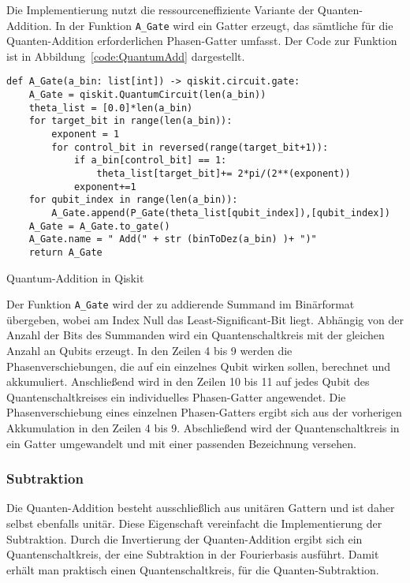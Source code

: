 Die Implementierung nutzt die ressourceneffiziente Variante der Quanten-Addition.
In der Funktion \texttt{A\_Gate} wird ein Gatter erzeugt, 
das sämtliche für die Quanten-Addition erforderlichen Phasen-Gatter umfasst.
Der Code zur Funktion ist in Abbildung~\ref{code:QuantumAdd} dargestellt.
\begin{listing}[H]
\begin{verbatim}    
def A_Gate(a_bin: list[int]) -> qiskit.circuit.gate:
    A_Gate = qiskit.QuantumCircuit(len(a_bin))
    theta_list = [0.0]*len(a_bin)
    for target_bit in range(len(a_bin)):
        exponent = 1
        for control_bit in reversed(range(target_bit+1)):
            if a_bin[control_bit] == 1:
                theta_list[target_bit]+= 2*pi/(2**(exponent))
            exponent+=1
    for qubit_index in range(len(a_bin)):
        A_Gate.append(P_Gate(theta_list[qubit_index]),[qubit_index])
    A_Gate = A_Gate.to_gate()
    A_Gate.name = " Add(" + str (binToDez(a_bin) )+ ")"
    return A_Gate 
  \end{verbatim}
  \caption{Quantum-Addition in Qiskit}
  \label{code:QuantumAdd}
\end{listing}
Der Funktion \texttt{A\_Gate} wird der zu addierende Summand im Binärformat übergeben, 
wobei am Index Null das Least-Significant-Bit liegt.
Abhängig von der Anzahl der Bits des Summanden wird ein Quantenschaltkreis mit der gleichen Anzahl an Qubits erzeugt. 
In den Zeilen 4 bis 9 werden die Phasenverschiebungen, die auf ein einzelnes Qubit wirken sollen, berechnet und akkumuliert.
Anschließend wird in den Zeilen 10 bis 11 auf jedes Qubit des Quantenschaltkreises ein individuelles Phasen-Gatter angewendet.
Die Phasenverschiebung eines einzelnen Phasen-Gatters ergibt sich aus der vorherigen Akkumulation in den Zeilen 4 bis 9.
Abschließend wird der Quantenschaltkreis in ein Gatter umgewandelt und mit einer passenden Bezeichnung versehen.

\subsubsection{Subtraktion}
Die Quanten-Addition besteht ausschließlich aus unitären Gattern und ist daher selbst ebenfalls unitär.
Diese Eigenschaft vereinfacht die Implementierung der Subtraktion. 
Durch die Invertierung der Quanten-Addition ergibt sich ein Quantenschaltkreis, 
der eine Subtraktion in der Fourierbasis ausführt. 
Damit erhält man praktisch einen Quantenschaltkreis, für die Quanten-Subtraktion.


